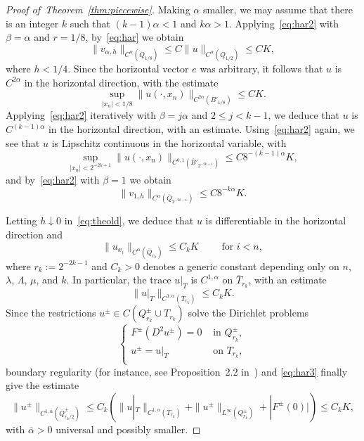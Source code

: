 \documentclass[letter,11pt]{amsart}
\theoremstyle{definition}
\numberwithin{equation}{section}
\begin{document}
\begin{proof}[Proof of~Theorem~\ref{thm:piecewise}]
\medskip

Making $\alpha$ smaller, we may assume that there is an integer $k$ such that $(k-1) \alpha < 1$ and $k \alpha > 1$.
Applying~\eqref{eq:har2} with $\beta = \alpha$ and $r = 1/8$, by~\eqref{eq:har} we obtain
\[
\|v_{\alpha,h}\|_{C^{\alpha}(\overline{Q}_{1/8})} \leq C \|u\|_{C^{\alpha}(\overline{Q}_{1/2})} \leq C K,
\]
where $h < 1/4$.
Since the horizontal vector $e$ was arbitrary, it follows that $u$ is $C^{2\alpha}$ in the horizontal direction, with the estimate
\[
\sup_{|x_n| < 1/8}\|u(\cdot,x_n)\|_{C^{2\alpha}(\overline{B}'_{1/8})}
\leq C K.
\]
Applying~\eqref{eq:har2} iteratively with $\beta = j \alpha$ and $2 \leq j < k-1$, 
we deduce that $u$ is $C^{(k-1) \alpha}$ in the horizontal direction, with an estimate.
Using~\eqref{eq:har2} again, we see that $u$ is Lipschitz continuous in the horizontal variable, with
\[
\sup_{|x_n| < 2^{-2k+1}} \|u(\cdot, x_n)\|_{C^{0,1}(\overline{B}'_{2^{-2k+1}})} \leq C 8^{-(k-1)\alpha} K,
\]
and by~\eqref{eq:har2} with $\beta = 1$ we obtain
\begin{equation}
\label{eq:theold}
\|v_{1,h}\|_{C^{\alpha}(\overline{Q}_{2^{-2k-1}})} \leq C 8^{-k\alpha}K.
\end{equation}

\medskip

Letting $h \downarrow 0$ in~\eqref{eq:theold}, 
we deduce that $u$ is differentiable in the horizontal direction and
\[
\|u_{x_i}\|_{C^{\alpha}(\overline{Q}_{r_k})} \leq C_k K \qquad \text{ for } i < n,
\]
where $r_k := 2^{-2k-1}$ and $C_k > 0$ denotes a generic constant depending only on $n$, $\lambda$, $\Lambda$, $\mu$, and $k$.
In particular, the trace $u|_{T}$ is $C^{1,\alpha}$ on $\overline{T}_{r_k}$, with an estimate
\begin{equation}
\label{eq:har3}
\|u|_{T}\|_{C^{1,\alpha}(\overline{T}_{r_k})} \leq C_k K.
\end{equation}
Since the restrictions $u^{\pm} \in C(Q_{r_k}^{\pm} \cup T_{r_k})$  solve the Dirichlet problems
\[
\begin{cases}
F^{\pm}(D^2 u^{\pm}) = 0 & \text{ in } Q_{r_k}^{\pm},\\
u^{\pm} = u|_{T}&  \text{ on } T_{r_k},\\
\end{cases}
\]
boundary regularity (for instance, see Proposition~2.2 in~\cite{MS}) and \eqref{eq:har3} finally give the estimate
\begin{equation}
\label{eq:theone}
\|u^{\pm}\|_{C^{1,\overline{\alpha}}(\overline{Q}^{\pm}_{r_k/2})} \leq C_k \left(
\|u|_{T}\|_{C^{1,\alpha}(\overline{T}_{r_k})} + \|u^{\pm}\|_{L^{\infty}(Q^{\pm}_{r_k})} + |F^{\pm}(0)| \right) \leq C_k K,
\end{equation}
with $\overline{\alpha} > 0$ universal and possibly smaller.


\end{proof}
\end{document}
